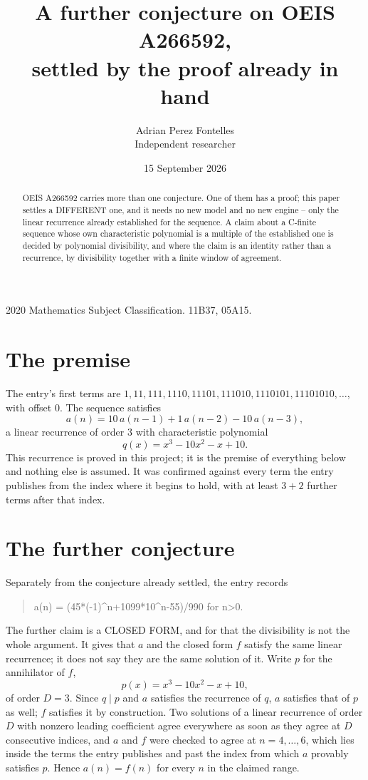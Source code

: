 \documentclass[11pt,a4paper]{article}
\title{A further conjecture on OEIS A266592,\\ \large settled by the proof already in hand}
\author{Adrian Perez Fontelles\\ \small Independent researcher}
\date{15 September 2026}
\theoremstyle{plain}
\theoremstyle{definition}
\begin{document}
\maketitle

\begin{abstract}
OEIS A266592 carries more than one conjecture. One of them has a proof; this paper settles a
DIFFERENT one, and it needs no new model and no new engine -- only the linear recurrence already
established for the sequence. A claim about a C-finite sequence whose own characteristic
polynomial is a multiple of the established one is decided by polynomial divisibility, and where
the claim is an identity rather than a recurrence, by divisibility together with a finite window
of agreement.
\end{abstract}

\noindent\small 2020 Mathematics Subject Classification. 11B37, 05A15.\normalsize

\section{The premise}

The entry's first terms are $1, 11, 111, 1110, 11101, 111010, 1110101, 11101010,\dots$, with offset $0$. The sequence satisfies
\[
  a(n)=10\,a(n-1) + 1\,a(n-2) - 10\,a(n-3) ,
\]
a linear recurrence of order $3$ with characteristic polynomial
\[
  q(x)=x^{3} - 10 x^{2} - x + 10 .
\]
This recurrence is proved in this project; it is the premise of everything below and nothing else is assumed.
It was confirmed against every term the entry publishes from the index where it begins to hold,
with at least $3+2$ further terms after that index.

\section{The further conjecture}

Separately from the conjecture already settled, the entry records

\begin{quote}\raggedright a(n) = (45*(-1)\^{}n+1099*10\^{}n-55)/990 for n>0.\end{quote}

The further claim is a CLOSED FORM, and for that the divisibility is not the whole argument. It
gives that $a$ and the closed form $f$ satisfy the same linear recurrence; it does not say they
are the same solution of it. Write $p$ for the annihilator of $f$,
\[
  p(x)=x^{3} - 10 x^{2} - x + 10 ,
\]
of order $D=3$. Since $q\mid p$ and $a$ satisfies the recurrence of $q$, $a$ satisfies that of
$p$ as well; $f$ satisfies it by construction. Two solutions of a linear recurrence of order $D$
with nonzero leading coefficient agree everywhere as soon as they agree at $D$ consecutive
indices, and $a$ and $f$ were checked to agree at $n=4,\dots,6$,
which lies inside the terms the entry publishes and past the index from which $a$ provably
satisfies $p$. Hence $a(n)=f(n)$ for every $n$ in the claimed range.
\end{document}
